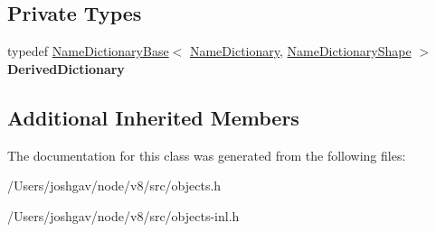 \subsection*{Private Types}
\begin{DoxyCompactItemize}
\item 
typedef \hyperlink{classv8_1_1internal_1_1_name_dictionary_base}{Name\+Dictionary\+Base}$<$ \hyperlink{classv8_1_1internal_1_1_name_dictionary}{Name\+Dictionary}, \hyperlink{classv8_1_1internal_1_1_name_dictionary_shape}{Name\+Dictionary\+Shape} $>$ {\bfseries Derived\+Dictionary}\hypertarget{classv8_1_1internal_1_1_name_dictionary_a40a0d8efb9ddc7a7874b4139d10f950c}{}\label{classv8_1_1internal_1_1_name_dictionary_a40a0d8efb9ddc7a7874b4139d10f950c}

\end{DoxyCompactItemize}
\subsection*{Additional Inherited Members}


The documentation for this class was generated from the following files\+:\begin{DoxyCompactItemize}
\item 
/\+Users/joshgav/node/v8/src/objects.\+h\item 
/\+Users/joshgav/node/v8/src/objects-\/inl.\+h\end{DoxyCompactItemize}
